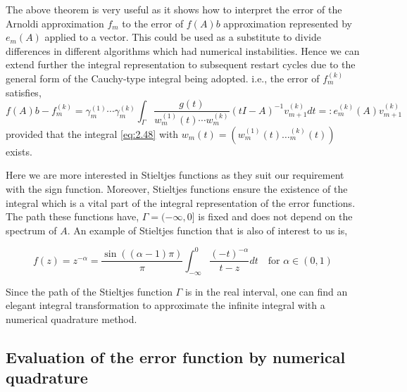 The above theorem is very useful as it shows how to interpret the error of the Arnoldi approximation $f_{m}$ to the error of $f(A)b$ approximation represented by $e_{m}(A)$ applied to a vector. This could be used as a substitute to divide differences in different algorithms which had numerical instabilities. Hence we can extend further the integral representation to subsequent restart cycles due to the general form of the Cauchy-type integral being adopted. i.e., the error of $f_{m}^{(k)}$ satisfies,
\begin{equation}
    f(A)b - f_{m}^{(k)} = \gamma_{m}^{(1)} \cdots \gamma_{m}^{(k)} \int_{\Gamma} \frac{g(t)}{w_{m}^{(1)}(t) \cdots w_{m}^{(k)}} (tI-A)^{-1}v_{m+1}^{(k)} dt =: e_{m}^{(k)}(A)v_{m+1}^{(k)}
    \label{eq:2.51}
\end{equation}
provided that the integral \ref{eq:2.48} with $w_{m}(t) = (w_{m}^{(1)}(t)\dots_{m}^{(k)}(t))$ exists.

Here we are more interested in Stieltjes functions as they suit our requirement with the sign function. Moreover, Stieltjes functions ensure the existence of the integral which is a vital part of the integral representation of the error functions. The path these functions have, $\Gamma=(-\infty, 0]$ is fixed and does not depend on the spectrum of $A$. An example of Stieltjes function that is also of interest to us is,

\begin{equation}
    f(z) = z^{-\alpha} = \frac{\sin((\alpha-1)\pi)}{\pi} \int_{-\infty}^{0} \frac{(-t)^{-\alpha}}{t-z} dt \quad \text{for } \alpha \in (0,1)
    \label{eq:2.52}
\end{equation}

Since the path of the Stieltjes function $\Gamma$ is in the real interval, one can find an elegant integral transformation to approximate the infinite integral with a numerical quadrature method.

\subsection{Evaluation of the error function by numerical quadrature}
\label{sec:eval_error_func_by_num_quad}

